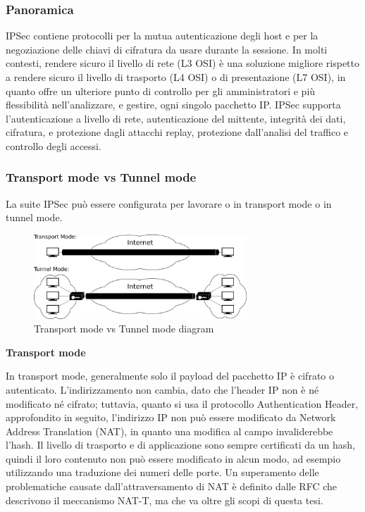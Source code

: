 \subsubsection{Panoramica}
IPSec contiene protocolli per la mutua autenticazione degli host e per la negoziazione delle chiavi di cifratura da usare durante la sessione.
In molti contesti, rendere sicuro il livello di rete (L3 OSI) è una soluzione migliore rispetto a rendere sicuro il livello di trasporto (L4 OSI) o di presentazione (L7 OSI), in quanto offre un ulteriore punto di controllo per gli amministratori e più flessibilità nell'analizzare, e gestire, ogni singolo pacchetto IP.
IPSec supporta l'autenticazione a livello di rete, autenticazione del mittente, integrità dei dati, cifratura, e protezione dagli attacchi replay, protezione dall'analisi del traffico e controllo degli accessi.

\subsubsection{Transport mode vs Tunnel mode}
La suite IPSec può essere configurata per lavorare o in transport mode o in tunnel mode.
\begin{figure}[ht]
    \centering
    \includegraphics[width=8cm]{figure/ipsec_modes.png}
    \caption{Transport mode vs Tunnel mode diagram}
\end{figure}


\noindent \textbf{Transport mode}

In transport mode, generalmente solo il payload del pacchetto IP è cifrato o autenticato. L'indirizzamento non cambia, dato che l'header IP non è né modificato né cifrato; tuttavia, quanto si usa il protocollo Authentication Header, approfondito in seguito, l'indirizzo IP non può essere modificato da Network Address Translation (NAT), in quanto una modifica al campo invaliderebbe l'hash. Il livello di trasporto e di applicazione sono sempre certificati da un hash, quindi il loro contenuto non può essere modificato in alcun modo, ad esempio utilizzando una traduzione dei numeri delle porte.
Un superamento delle problematiche causate dall'attraversamento di NAT è definito dalle RFC che descrivono il meccanismo NAT-T, ma che va oltre gli scopi di questa tesi.

